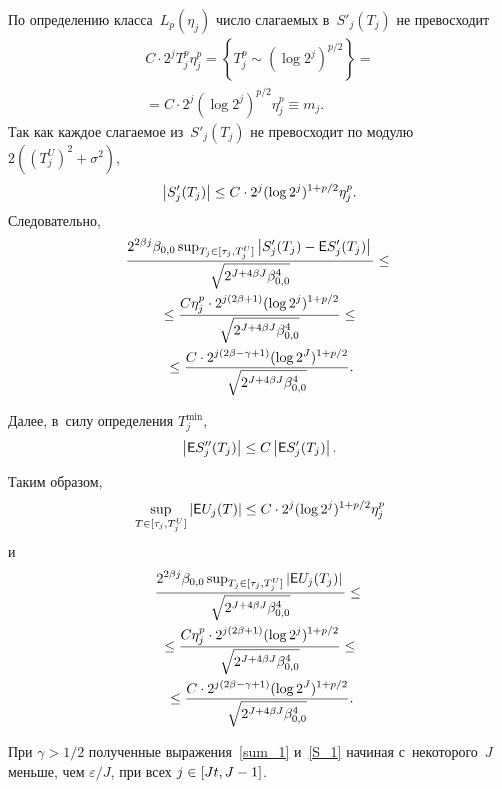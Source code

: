 \begin{multicols}{2}
По определению класса~$L_p(\eta_j)$ число слагаемых в~$S'_{j}(T_{j})$ не 
превосходит
\begin{multline*}
C\cdot 2^j  T_{j}^p \eta^p_j  = \left\{T_{j}^p \sim (\log 2^j)^{{p}/{2}}\right\} ={}\\
{}= C  \cdot 2^j(\log 2^j)^{{p}/{2}} \eta_j^p\equiv m_j.
\end{multline*}
Так как каждое слагаемое из~$S'_{j}(T_{j})$ не превосходит по модулю 
$2\left((T_j^U)^2+\sigma^2\right)$,
$$
\left\vert S'_{j}(T_{j})\right\vert\leq C \cdot 2^j(\log 2^j)^{1+{p}/{2}}  \eta^p_j.
$$
Следовательно,
\begin{multline}
    \displaystyle\frac{\displaystyle 2^{2\beta j} \beta_{0,0}  
\sup\nolimits_{T_{j}\in[\tau_j,T_{j}^U]}\left\vert S'_{j}(T_{j}) - {\sf E} S'_{j}(T_{j})\right\vert \mathstrut}{\displaystyle \sqrt{2^{J+4\beta J} \beta_{0,0}^4}\mathstrut} \le{}\\
{}\le \displaystyle\frac{\displaystyle C \eta_j^p \cdot 2^{j(2\beta + 1)} (\log 2^j)^{1+p/2}\mathstrut}{\displaystyle \sqrt{2^{J+4\beta J} \beta_{0,0}^4}\mathstrut} \le {}\\
{}\le \displaystyle\frac{\displaystyle C \cdot  2^{j(2\beta -\gamma + 1)} (\log 2^J)^{1+p/2}\mathstrut}{\displaystyle \sqrt{2^{J+4\beta J} 
\beta_{0,0}^4}\mathstrut}.
\label{sum_1}
\end{multline}

Далее, в~силу определения $T_j^{\min}$, 
$$
\left\vert{\sf E} S''_{j}(T_{j})\right\vert \leq C  \left\vert{\sf E} S'_{j}(T_{j})\right\vert.
$$

Таким образом, 
$$
\sup\limits_{T\in[\tau_j,T_{j}^U]}\left\vert{\sf E} U_j(T)\right\vert\leq C \cdot 2^j
(\log 2^j)^{1+{p}/{2}}  \eta^p_j 
$$
и
\begin{multline}
\label{S_1}
\displaystyle\frac{\displaystyle 2^{2\beta j}\beta_{0,0}  \sup\nolimits_{T_{j}\in[\tau_j,T_{j}^U]}
\left\vert{\sf E} U_j(T_{j})\right\vert \mathstrut}{\displaystyle \sqrt{2^{J+4\beta J} 
\beta_{0,0}^4}\mathstrut} \le{}\\
{}\le  \displaystyle\frac{\displaystyle C\eta_j^p \cdot 2^{j(2\beta + 1)} (\log 2^j)^{1+p/2}\mathstrut}{\displaystyle \sqrt{2^{J+4\beta J} \beta_{0,0}^4}\mathstrut} \le{}\\
{}\le \displaystyle\frac{\displaystyle C \cdot 2^{j(2\beta -\gamma + 1)} (\log 2^J)^{1+p/2}\mathstrut}{\displaystyle \sqrt{2^{J+4\beta J} \beta_{0,0}^4}\mathstrut}.
\end{multline}

При $\gamma>1/2$ полученные выражения~\eqref{sum_1} и~\eqref{S_1} начиная 
с~некоторого~$J$ меньше, чем $\varepsilon/J$, при всех $j \hm\in [Jt, J-1]$.


\end{multicols}
